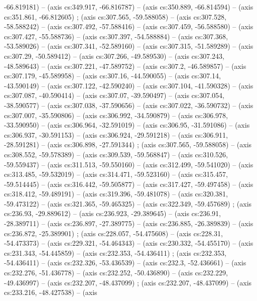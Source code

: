   -66.819181) -- (axis cs:349.917, -66.816787) -- (axis cs:350.889,
  -66.814594) -- (axis cs:351.861, -66.812605) ; 
  (axis cs:307.565, -59.588058) -- (axis cs:307.528, -58.588242) -- (axis
  cs:307.492, -57.588416) -- (axis cs:307.459, -56.588580) -- (axis
  cs:307.427, -55.588736) -- (axis cs:307.397, -54.588884) -- (axis
  cs:307.368, -53.589026) -- (axis cs:307.341, -52.589160) -- (axis
  cs:307.315, -51.589289) -- (axis cs:307.29, -50.589412) -- (axis cs:307.266,
  -49.589530) -- (axis cs:307.243, -48.589643) -- (axis cs:307.221,
  -47.589752) -- (axis cs:307.2, -46.589857) -- (axis cs:307.179, -45.589958)
  -- (axis cs:307.16, -44.590055) -- (axis cs:307.14, -43.590149) -- (axis
  cs:307.122, -42.590240) -- (axis cs:307.104, -41.590328) -- (axis
  cs:307.087, -40.590414) -- (axis cs:307.07, -39.590497) -- (axis cs:307.054,
  -38.590577) -- (axis cs:307.038, -37.590656) -- (axis cs:307.022,
  -36.590732) -- (axis cs:307.007, -35.590806) -- (axis cs:306.992,
  -34.590879) -- (axis cs:306.978, -33.590950) -- (axis cs:306.964,
  -32.591019) -- (axis cs:306.95, -31.591086) -- (axis cs:306.937, -30.591153)
  -- (axis cs:306.924, -29.591218) -- (axis cs:306.911, -28.591281) -- (axis
  cs:306.898, -27.591344) ;  (axis cs:307.565,
  -59.588058) -- (axis cs:308.552, -59.578389) -- (axis cs:309.539,
  -59.568847) -- (axis cs:310.526, -59.559437) -- (axis cs:311.513,
  -59.550160) -- (axis cs:312.499, -59.541020) -- (axis cs:313.485,
  -59.532019) -- (axis cs:314.471, -59.523160) -- (axis cs:315.457,
  -59.514445) -- (axis cs:316.442, -59.505877) -- (axis cs:317.427,
  -59.497458) -- (axis cs:318.412, -59.489191) -- (axis cs:319.396,
  -59.481078) -- (axis cs:320.381, -59.473122) -- (axis cs:321.365,
  -59.465325) -- (axis cs:322.349, -59.457689) ; 
  (axis cs:236.93, -29.889612) -- (axis cs:236.923, -29.389645) -- (axis
  cs:236.91, -28.389711) -- (axis cs:236.897, -27.389775) -- (axis cs:236.885,
  -26.389839) -- (axis cs:236.872, -25.389901) ; 
  (axis cs:228.057, -54.475608) -- (axis cs:228.31, -54.473373) -- (axis
  cs:229.321, -54.464343) -- (axis cs:230.332, -54.455170) -- (axis
  cs:231.343, -54.445859) -- (axis cs:232.353, -54.436411)
  ;  (axis cs:232.353, -54.436411) -- (axis
  cs:232.326, -53.436539) -- (axis cs:232.3, -52.436661) -- (axis cs:232.276,
  -51.436778) -- (axis cs:232.252, -50.436890) -- (axis cs:232.229,
  -49.436997) -- (axis cs:232.207, -48.437099) ; 
  (axis cs:232.207, -48.437099) -- (axis cs:233.216, -48.427538) -- (axis
